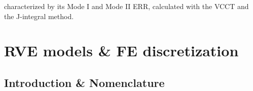 \documentclass[review]{elsarticle}
\begin{document}
characterized by its Mode I and Mode II ERR, calculated with the VCCT and the J-integral method.


\section{RVE models \& FE discretization}


\subsection{Introduction \& Nomenclature}\label{subsec:names}
\end{document}
